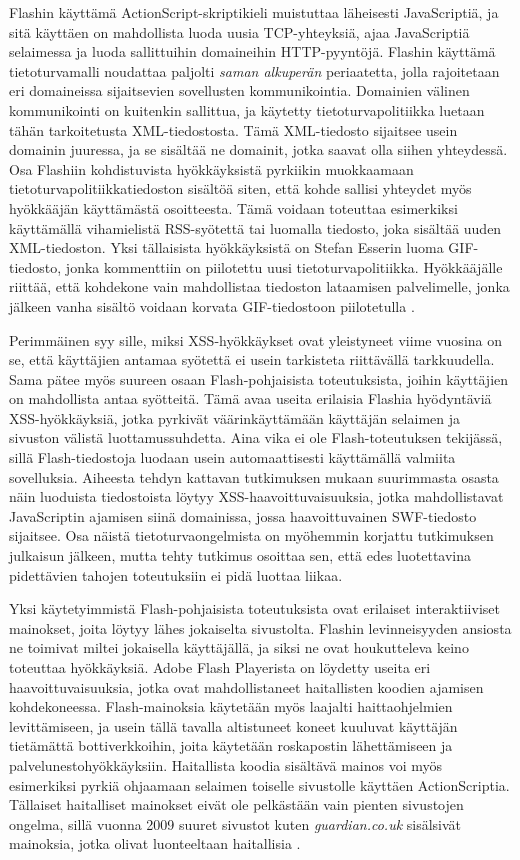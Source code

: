 Flashin käyttämä ActionScript-skriptikieli muistuttaa läheisesti JavaScriptiä, ja sitä käyttäen on mahdollista luoda uusia TCP-yhteyksiä, ajaa JavaScriptiä selaimessa ja luoda 
sallittuihin domaineihin HTTP-pyyntöjä. Flashin käyttämä tietoturvamalli noudattaa paljolti \emph{saman alkuperän} periaatetta, jolla rajoitetaan eri domaineissa sijaitsevien sovellusten 
kommunikointia. Domainien välinen kommunikointi on kuitenkin sallittua, ja käytetty tietoturvapolitiikka luetaan tähän tarkoitetusta XML-tiedostosta. Tämä XML-tiedosto sijaitsee usein 
domainin juuressa, ja se sisältää ne domainit, jotka saavat olla siihen yhteydessä. Osa Flashiin kohdistuvista hyökkäyksistä pyrkiikin muokkaamaan tietoturvapolitiikkatiedoston sisältöä
siten, että kohde sallisi yhteydet myös hyökkääjän käyttämästä osoitteesta. Tämä voidaan toteuttaa esimerkiksi käyttämällä vihamielistä RSS-syötettä tai luomalla tiedosto, joka sisältää
uuden XML-tiedoston. Yksi tällaisista hyökkäyksistä on Stefan Esserin luoma GIF-tiedosto, jonka kommenttiin on piilotettu uusi tietoturvapolitiikka. Hyökkääjälle riittää, että kohdekone 
vain mahdollistaa tiedoston lataamisen palvelimelle, jonka jälkeen vanha sisältö voidaan korvata GIF-tiedostoon piilotetulla \cite{WEB2}.

Perimmäinen syy sille, miksi XSS-hyökkäykset ovat yleistyneet viime vuosina on se, että käyttäjien antamaa syötettä ei usein tarkisteta riittävällä tarkkuudella. Sama pätee myös suureen 
osaan Flash-pohjaisista toteutuksista, joihin käyttäjien on mahdollista antaa syötteitä. Tämä avaa useita erilaisia Flashia hyödyntäviä XSS-hyökkäyksiä, jotka pyrkivät väärinkäyttämään 
käyttäjän selaimen ja sivuston välistä luottamussuhdetta. Aina vika ei ole Flash-toteutuksen tekijässä, sillä Flash-tiedostoja luodaan usein automaattisesti käyttämällä valmiita 
sovelluksia. Aiheesta tehdyn kattavan tutkimuksen mukaan \cite{FlashXSS} suurimmasta osasta näin luoduista tiedostoista löytyy XSS-haavoittuvaisuuksia, jotka mahdollistavat JavaScriptin
ajamisen siinä domainissa, jossa haavoittuvainen SWF-tiedosto sijaitsee. Osa näistä tietoturvaongelmista on myöhemmin korjattu tutkimuksen julkaisun jälkeen, mutta tehty tutkimus osoittaa 
sen, että edes luotettavina pidettävien tahojen toteutuksiin ei pidä luottaa liikaa.

Yksi käytetyimmistä Flash-pohjaisista toteutuksista ovat erilaiset interaktiiviset mainokset, joita löytyy lähes jokaiselta sivustolta. Flashin levinneisyyden ansiosta ne toimivat miltei
jokaisella käyttäjällä, ja siksi ne ovat houkutteleva keino toteuttaa hyökkäyksiä. Adobe Flash Playerista on löydetty useita eri haavoittuvaisuuksia, jotka ovat mahdollistaneet haitallisten
koodien ajamisen kohdekoneessa. Flash-mainoksia käytetään myös laajalti haittaohjelmien levittämiseen, ja usein tällä tavalla altistuneet koneet kuuluvat käyttäjän tietämättä 
bottiverkkoihin, joita käytetään roskapostin lähettämiseen ja palvelunestohyökkäyksiin. Haitallista koodia sisältävä mainos voi myös esimerkiksi pyrkiä ohjaamaan selaimen toiselle 
sivustolle käyttäen ActionScriptia.  Tällaiset haitalliset mainokset eivät ole pelkästään vain pienten sivustojen ongelma, sillä vuonna 2009 suuret sivustot kuten \emph{guardian.co.uk} 
sisälsivät mainoksia, jotka olivat luonteeltaan haitallisia \cite{FlashAdd}.

